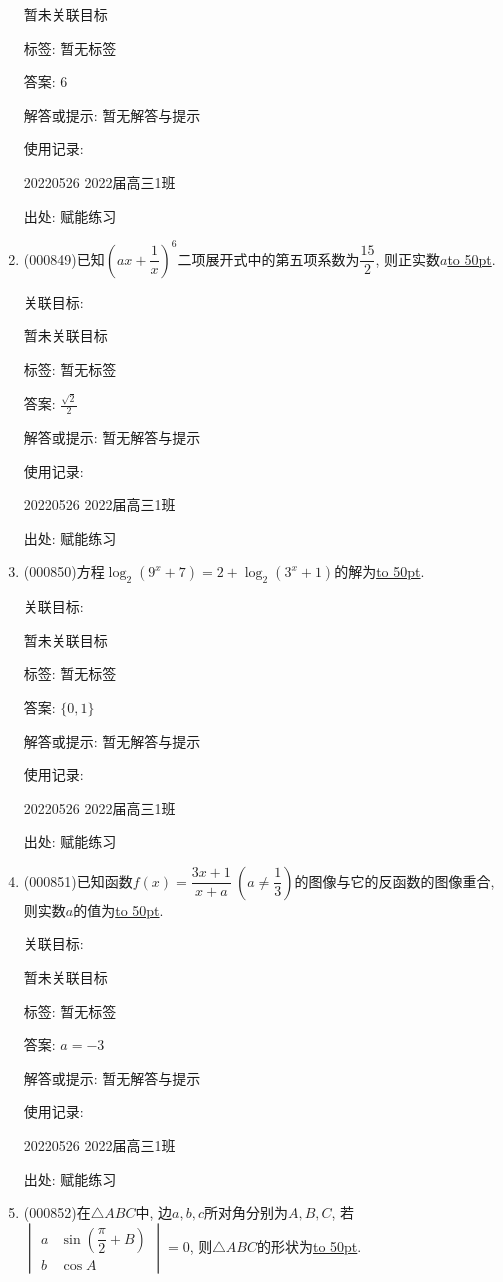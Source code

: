 \documentclass[10pt,a4paper]{article}
\newcommand{\blank}[1]{\underline{\hbox to #1pt{}}}
\begin{document}
\begin{enumerate}[1.]
暂未关联目标



标签: 暂无标签

答案: $6$

解答或提示: 暂无解答与提示

使用记录:

20220526	2022届高三1班	


出处: 赋能练习
\item { (000849)}已知$(ax+\dfrac1x)^6$二项展开式中的第五项系数为$\dfrac{15}2$, 则正实数$a$\blank{50}.


关联目标:

暂未关联目标



标签: 暂无标签

答案: $\frac{\sqrt 2}2$

解答或提示: 暂无解答与提示

使用记录:

20220526	2022届高三1班	


出处: 赋能练习
\item { (000850)}方程$\log_2(9^x+7)=2+\log_2(3^x+1)$的解为\blank{50}.


关联目标:

暂未关联目标



标签: 暂无标签

答案: $\{0,1\}$

解答或提示: 暂无解答与提示

使用记录:

20220526	2022届高三1班	


出处: 赋能练习
\item { (000851)}已知函数$f(x)=\dfrac{3x+1}{x+a}\ (a\ne \dfrac13)$的图像与它的反函数的图像重合, 则实数$a$的值为\blank{50}.


关联目标:

暂未关联目标



标签: 暂无标签

答案: $a=-3$

解答或提示: 暂无解答与提示

使用记录:

20220526	2022届高三1班	


出处: 赋能练习
\item { (000852)}在$\triangle ABC$中, 边$a,b,c$所对角分别为$A,B,C$, 若$\begin{vmatrix} a & \sin (\dfrac{\pi}2+B)  \\ b & \cos A  \end{vmatrix}=0$, 则$\triangle ABC$的形状为\blank{50}.



\end{enumerate}
\end{document}
